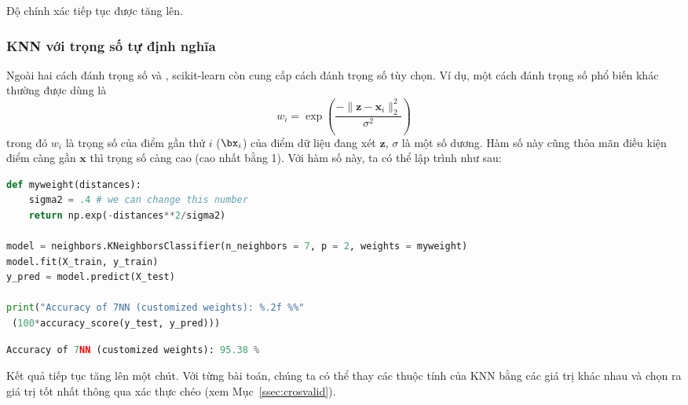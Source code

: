 

Độ chính xác tiếp tục được tăng lên. 

\subsubsection{KNN với trọng số tự định nghĩa}
Ngoài hai cách đánh trọng số  và , scikit-learn còn cung
cấp cách đánh trọng số tùy chọn. Ví dụ, một cách
đánh trọng số phổ biến khác thường được dùng là
\begin{equation*}
w_i = \exp \left( \frac{-\|\mathbf{z} - \mathbf{x}_i\|_2^2}{\sigma^2}
\right)
\end{equation*}
trong đó $w_i$ là trọng số của điểm gần thứ $i$ ($\bx_i$) của điểm dữ liệu
đang xét $\mathbf{z}$, $\sigma$ là một số dương. Hàm số này cũng
thỏa mãn
điều kiện điểm càng gần $\mathbf{x}$ thì trọng số càng cao (cao nhất bằng 1).
Với hàm số này, ta có thể lập trình như sau:


\begin{lstlisting}[language=Python]
def myweight(distances):
    sigma2 = .4 # we can change this number
    return np.exp(-distances**2/sigma2)

model = neighbors.KNeighborsClassifier(n_neighbors = 7, p = 2, weights = myweight)
model.fit(X_train, y_train)
y_pred = model.predict(X_test)

print("Accuracy of 7NN (customized weights): %.2f %%"
 (100*accuracy_score(y_test, y_pred)))
\end{lstlisting}
\kq
\begin{lstlisting}[language=Python]
Accuracy of 7NN (customized weights): 95.38 %
\end{lstlisting}

Kết quả tiếp tục tăng lên một chút. Với từng bài toán, chúng ta có thể
thay các thuộc tính của KNN bằng các giá trị khác nhau và chọn ra giá trị tốt
nhất thông qua xác thực chéo (xem Mục~\ref{ssec:crosvalid}).




